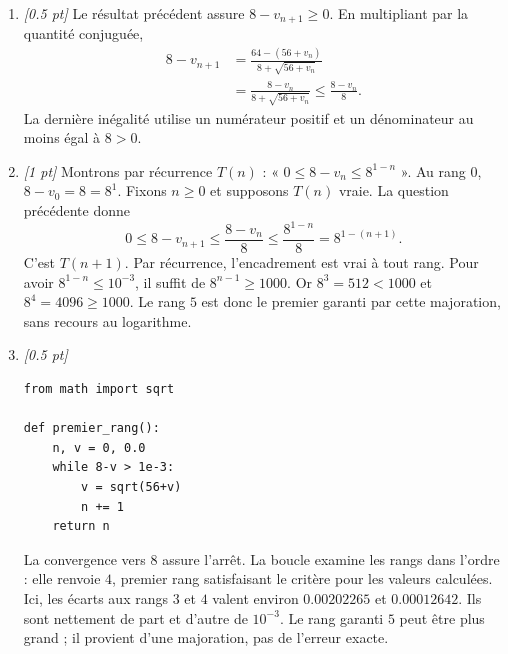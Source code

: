\begin{enumerate}
\item \textit{[\num{0,5} pt]} Le résultat précédent assure $8-v_{n+1}\ge0$. En multipliant par la quantité conjuguée,
\[\begin{aligned}8-v_{n+1}&=\frac{64-(56+v_n)}{8+\sqrt{56+v_n}}\\&=\frac{8-v_n}{8+\sqrt{56+v_n}}\le\frac{8-v_n}{8}.\end{aligned}\]
La dernière inégalité utilise un numérateur positif et un dénominateur au moins égal à $8>0$.

\item \textit{[1 pt]} Montrons par récurrence $T(n)$ : « $0\le 8-v_n\le 8^{1-n}$ ».
Au rang $0$, $8-v_0=8=8^1$. Fixons $n\ge0$ et supposons $T(n)$ vraie. La question précédente donne
\[0\le 8-v_{n+1}\le\frac{8-v_n}{8}\le\frac{8^{1-n}}{8}=8^{1-(n+1)}.\]
C'est $T(n+1)$. Par récurrence, l'encadrement est vrai à tout rang.
Pour avoir $8^{1-n}\le10^{-3}$, il suffit de $8^{n-1}\ge1000$.
Or $8^{3}=512<1000$ et $8^{4}=4096\ge1000$. Le rang $5$ est donc le premier garanti par cette majoration, sans recours au logarithme.


\item \textit{[\num{0,5} pt]} 
\begin{lstlisting}
from math import sqrt

def premier_rang():
    n, v = 0, 0.0
    while 8-v > 1e-3:
        v = sqrt(56+v)
        n += 1
    return n
\end{lstlisting}
La convergence vers $8$ assure l'arrêt. La boucle examine les rangs dans l'ordre : elle renvoie $4$, premier rang satisfaisant le critère pour les valeurs calculées. Ici, les écarts aux rangs $3$ et $4$ valent environ $\num{0,00202265}$ et $\num{0,00012642}$. Ils sont nettement de part et d'autre de $10^{-3}$. Le rang garanti $5$ peut être plus grand ; il provient d'une majoration, pas de l'erreur exacte.

\end{enumerate}

